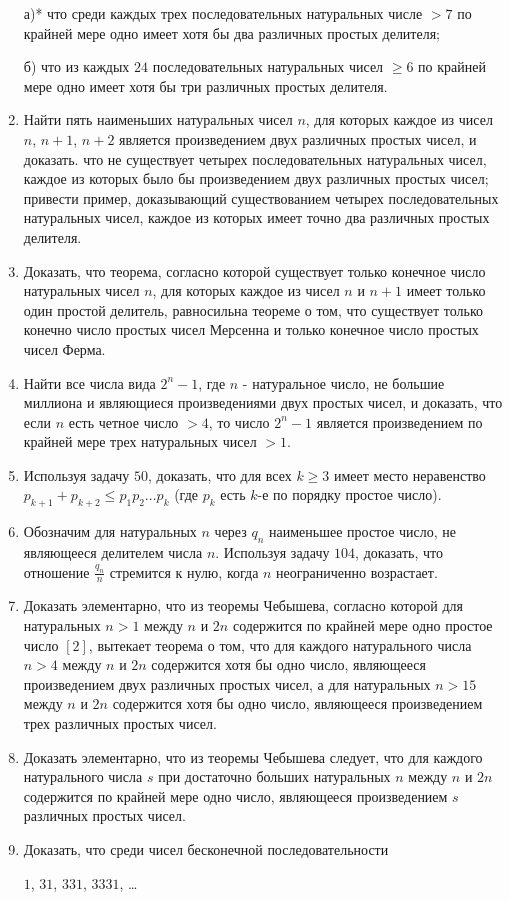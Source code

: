 \documentclass[12pt, a4paper, openany]{book}
\begin{document}
\begin{enumerate}
	а)* что среди каждых трех последовательных натуральных числе $>7$ по крайней мере одно имеет хотя бы два различных простых делителя;
	
	б) что из каждых $24$ последовательных натуральных чисел  $\geqslant 6$ по крайней мере одно имеет хотя бы три различных простых делителя.
	
	\item Найти пять наименьших натуральных чисел $n$, для которых каждое из чисел $n$, $n+1$, $n+2$ является произведением двух различных простых чисел, и доказать. что не существует четырех последовательных натуральных чисел, каждое из которых было бы произведением двух различных простых чисел; привести пример, доказывающий существованием четырех последовательных натуральных чисел, каждое из которых имеет точно два различных простых делителя.
	\item Доказать, что теорема, согласно которой существует только конечное число натуральных чисел $n$, для которых каждое из чисел $n$ и $n+1$ имеет только один простой делитель, равносильна теореме о том, что существует только конечно число простых чисел Мерсенна и только конечное число простых чисел Ферма.
	\item Найти все числа вида $2^n - 1$, где $n$ - натуральное число, не большие миллиона и являющиеся произведениями двух простых чисел, и доказать, что если $n$ есть четное число $>4$, то число $2^n-1$ является произведением по крайней мере трех натуральных чисел $>1$.
	\item Используя задачу $50$, доказать, что для всех $k \geqslant 3$ имеет место неравенство $p_{k+1} + p_{k+2}\leqslant p_1 p_2 \ldots p_k$ (где $p_k$ есть $k$-е по порядку простое число).
	\item Обозначим для натуральных $n$ через $q_n$ наименьшее простое число, не являющееся делителем числа $n$. Используя задачу $104$, доказать, что отношение $\displaystyle \frac{q_n}{n}$ стремится к нулю, когда $n$ неограниченно возрастает.
	\item Доказать элементарно, что из теоремы Чебышева, согласно которой для натуральных $n>1$ между $n$ и $2n$ содержится по крайней мере одно простое число $[2]$, вытекает теорема о том, что для каждого натурального числа $n>4$ между $n$ и $2n$ содержится хотя бы одно число, являющееся произведением двух различных простых чисел, а для натуральных $n>15$ между $n$ и $2n$ содержится хотя бы одно число, являющееся произведением трех различных простых чисел.
	\item Доказать элементарно, что из теоремы Чебышева следует, что для каждого натурального числа $s$ при достаточно больших натуральных $n$ между $n$ и $2n$ содержится по крайней мере одно число, являющееся произведением $s$ различных простых чисел.
	\item Доказать, что среди чисел бесконечной последовательности
			\begin{center}
$1$, $31$, $331$, $3331$, \dots
	\end{center}
	

\end{enumerate}
\end{document}
